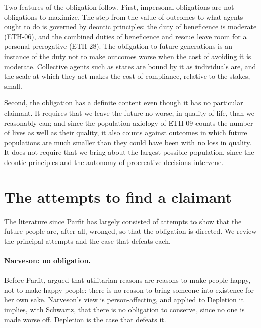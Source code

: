 \documentclass{situationist-preprint}
\begin{document}
Two features of the obligation follow. First, impersonal obligations are not obligations to maximize. The step from the value of outcomes to what agents ought to do is governed by deontic principles: the duty of beneficence is moderate (ETH-06), and the combined duties of beneficence and rescue leave room for a personal prerogative (ETH-28). The obligation to future generations is an instance of the duty not to make outcomes worse when the cost of avoiding it is moderate. Collective agents such as states are bound by it as individuals are, and the scale at which they act makes the cost of compliance, relative to the stakes, small.

Second, the obligation has a definite content even though it has no particular claimant. It requires that we leave the future no worse, in quality of life, than we reasonably can; and since the population axiology of ETH-09 counts the number of lives as well as their quality, it also counts against outcomes in which future populations are much smaller than they could have been with no loss in quality. It does not require that we bring about the largest possible population, since the deontic principles and the autonomy of procreative decisions intervene.

\section{The attempts to find a claimant}\label{s:history}

The literature since Parfit has largely consisted of attempts to show that the future people are, after all, wronged, so that the obligation is directed. We review the principal attempts and the case that defeats each.

\paragraph{Narveson: no obligation.} Before Parfit, \citet{Narveson1967} argued that utilitarian reasons are reasons to make people happy, not to make happy people: there is no reason to bring someone into existence for her own sake. Narveson's view is person-affecting, and applied to Depletion it implies, with Schwartz, that there is no obligation to conserve, since no one is made worse off. Depletion is the case that defeats it.
\end{document}
